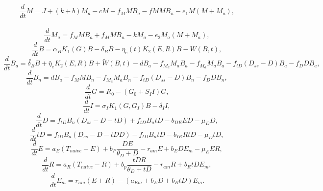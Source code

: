 \begin{appendices}
\begin{equation}\label{eq:dM/dt}
    \frac{d}{dt}M = J+(k+b)M_{a}-cM-f_{M}MB_{a}-f{M}MB_{n}-e_{1}M(M+M_{a}),
\end{equation}\\

\begin{equation}\label{eq:dM_a/dt}
    \frac{d}{dt}M_{a} = f_{M}MB_{a}+f_{M}MB_{n}-kM_a-e_{2}M_{a}(M+M_{a}),
\end{equation}
\begin{equation}\label{eq:dB/dt}
    \frac{d}{dt}B = \alpha_{B}K_{1}(G)B-\delta_{B}B-\eta_{e}(t)K_{2}(E,R)B-W(B,t),
\end{equation}
\begin{equation} \label{eq:dB_a/dt}
    \frac{d}{dt}B_a = \tilde{\delta_B}B+\tilde{\eta_e}K_2(E,R)B+\tilde{W}(B,t)-dB_a-f_{M_a}M_{a}B_a-f_{M_a}M_{a}B_a-f_{tD}(D_{ss}-D)B_a-f_{D}DB_a,
\end{equation}
\begin{equation}\label{dB_n/dt}
    \frac{d}{dt}B_n = dB_a-f_{M}MB_n-f_{M_a}M_{a}B_n-f_{tD}(D_{ss}-D)B_n-f_{D}DB_n,
\end{equation}
\begin{equation}\label{eq:dG/dt}
    \frac{d}{dt}G = R_0-(G_0+S_{I}I)G,
\end{equation}
\begin{equation}\label{eq:dI/dt}
    \frac{d}{dt}I = \sigma_{I}K_{1}(G,G_{I})B-\delta_{I}I,
\end{equation}
\begin{equation}\label{eq:dD/dt}
    \frac{d}{dt}D = f_{tD}B_{n}(D_{ss}-D-tD)+f_{tD}B_{n}tD-b_{DE}ED-\mu_{D}D,
\end{equation}
\begin{equation}\label{eq:tD/dt}
    \frac{d}{dt}tD = f_{tD}B_{a}(D_{ss}-D-tDD)-f_{tD}B_{n}tD-b_{IR}RtD-\mu_{D}tD,
\end{equation}
\begin{equation}\label{eq:dE/dt}
    \frac{d}{dt}E = a_{E}(T_{naive}-E)+b_{P}\frac{DE}{\theta_{D}+D}-r_{am}E+b_{E}DE_{m}-\mu_{E}ER,
\end{equation}
\begin{equation}\label{eq:dR/dt}
    \frac{d}{dt}R= a_R(T_{naive}-R)+b_{p}\frac{tDR}{\theta_D+tD}-r_{am}R+b_{R}tDE_m,
\end{equation}
\begin{equation}\label{dE_m/dt}
    \frac{d}{dt}E_m = r_{am}(E+R)-(a_{Em}+b_ED+b_{R}tD)E_m.
\end{equation}


\end{appendices}
